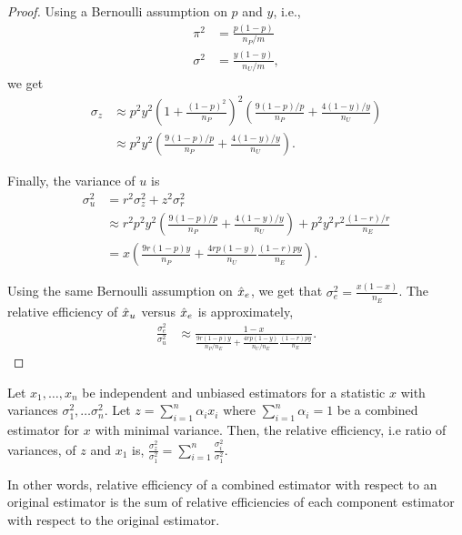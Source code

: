 \begin{proof}
  Using a Bernoulli assumption on $p$ and $y$, i.e., 
  \begin{align*}
    \pi^2 &= \frac{p (1-p)}{n_P/m} \\
    \sigma^2 &= \frac{y (1-y)}{n_U/m},
  \end{align*}
  we get
  \begin{align*}
    \sigma_z &\approx 
        p^2 y^2
        {\left(1 + \frac{{(1-p)}^2}{n_P} \right)}^2
        \left(
        \frac{9 (1-p)/p}{n_P}  +
        \frac{4 (1-y)/y}{n_U}
          \right) \\
        &\approx
        p^2 y^2
        \left(
        \frac{9 (1-p)/p}{n_P}  +
        \frac{4 (1-y)/y}{n_U}
          \right).
  \end{align*}

  Finally, the variance of $u$ is 
  \begin{align*}
  \sigma_u^2 &= r^2 \sigma_z^2 + z^2 \sigma_r^2 \\
        &\approx r^2 p^2 y^2
        \left(
        \frac{9 (1-p)/p}{n_P}  +
        \frac{4 (1-y)/y}{n_U}
          \right) +
          p^2 y^2 r^2 \frac{(1-r)/r}{n_E} \\
        &= x
        \left(
        \frac{9 r(1-p)y}{n_P}  +
        \frac{4 rp(1-y)}{n_U}
          \frac{(1-r)py}{n_E}
          \right).
  \end{align*}

  Using the same Bernoulli assumption on $\hat{x}_e$, we get that $\sigma^2_e = \frac{x (1-x)}{n_E}$.
  The relative efficiency of $\hat{x}_u$ versus $\hat{x}_e$ is approximately,
  \begin{align*}
    \frac{\sigma_e^2}{\sigma_u^2}
    &\approx \frac{1-x
      }{
        \frac{9 r(1-p)y}{n_P/n_E}  +
        \frac{4 rp(1-y)}{n_U/n_E}
          \frac{(1-r)py}{n_E}
        }.
  \end{align*}
\end{proof}


\begin{lemma}
  Let $x_1, \dots, x_n$ be independent and unbiased estimators for a statistic $x$ with variances $\sigma_1^2, \dots \sigma_n^2$.
  Let $z = \sum_{i=1}^n \alpha_i x_i$ where $\sum_{i=1}^n \alpha_i = 1$ be a combined estimator for $x$ with minimal variance.
  Then, the relative efficiency, i.e ratio of variances, of $z$ and $x_1$ is,
  $\frac{\sigma_z^2}{\sigma_1^2} = \sum_{i=1}^n \frac{\sigma_i^2}{\sigma_1^2}$.

  In other words, relative efficiency of a combined estimator with respect
  to an original estimator is the sum of relative efficiencies of each component
  estimator with respect to the original estimator. 
\end{lemma}


